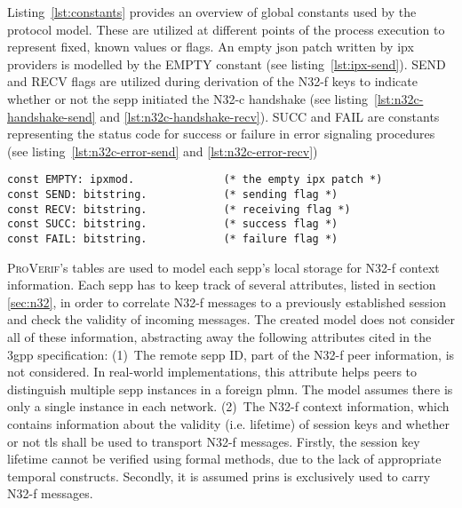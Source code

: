 Listing~\ref{lst:constants} provides an overview of global constants used by the protocol model.
These are utilized at different points of the process execution to represent fixed, known values or flags.
An empty \gls{json} patch written by \gls{ipx} providers is modelled by the {\sffamily EMPTY} constant (see listing~\ref{lst:ipx-send}).
{\sffamily SEND} and {\sffamily RECV} flags are utilized during derivation of the N32-f keys to indicate whether or not the \gls{sepp} initiated the N32-c handshake (see listing~\ref{lst:n32c-handshake-send} and \ref{lst:n32c-handshake-recv}).
{\sffamily SUCC} and {\sffamily FAIL} are constants representing the status code for success or failure in error signaling procedures (see listing~\ref{lst:n32c-error-send} and \ref{lst:n32c-error-recv})

\begin{lstlisting}[caption={Global constant declarations},label={lst:constants},firstnumber=24]
const EMPTY: ipxmod.              (* the empty ipx patch *)
const SEND: bitstring.            (* sending flag *)
const RECV: bitstring.            (* receiving flag *)
const SUCC: bitstring.            (* success flag *)
const FAIL: bitstring.            (* failure flag *)
\end{lstlisting}

\textsc{ProVerif}'s tables are used to model each \gls{sepp}'s local storage for N32-f context information.
Each \gls{sepp} has to keep track of several attributes, listed in section \ref{sec:n32}, in order to correlate N32-f messages to a previously established session and check the validity of incoming messages.
The created model does not consider all of these information, abstracting away the following attributes cited in the \gls{3gpp} specification:
(1)~The remote \gls{sepp} ID, part of the N32-f peer information, is not considered.
In real-world implementations, this attribute helps peers to distinguish multiple \gls{sepp} instances in a foreign \gls{plmn}.
The model assumes there is only a single instance in each network.
(2)~The N32-f context information, which contains information about the validity (i.e. lifetime) of session keys and whether or not \gls{tls} shall be used to transport N32-f messages.
Firstly, the session key lifetime cannot be verified using formal methods, due to the lack of appropriate temporal constructs.
Secondly, it is assumed \gls{prins} is exclusively used to carry N32-f messages.

